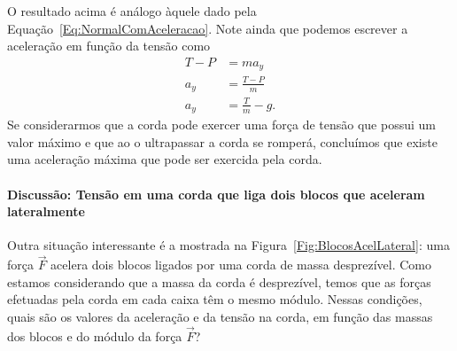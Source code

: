 \noindent{}O resultado acima é análogo àquele dado pela Equação~\eqref{Eq:NormalComAceleracao}. Note ainda que podemos escrever a aceleração em função da tensão como
\begin{align}
    T - P &= m a_y \\
    a_y &= \frac{T - P}{m} \\
    a_y &= \frac{T}{m} - g.
\end{align}
%
Se considerarmos que a corda pode exercer uma força de tensão que possui um valor máximo e que ao o ultrapassar a corda se romperá, concluímos que existe uma aceleração máxima que pode ser exercida pela corda. 

\paragraph{Discussão: Tensão em uma corda que liga dois blocos que aceleram lateralmente}
\label{Par:Discussao:TensaoEmCordaQueLigaDoisBlocos}

Outra situação interessante é a mostrada na Figura~\ref{Fig:BlocosAcelLateral}: uma força $\vec{F}$ acelera dois blocos ligados por uma corda de massa desprezível. Como estamos considerando que a massa da corda é desprezível, temos que as forças efetuadas pela corda em cada caixa têm o mesmo módulo. Nessas condições, quais são os valores da aceleração e da tensão na corda, em função das massas dos blocos e do módulo da força $\vec{F}$?

